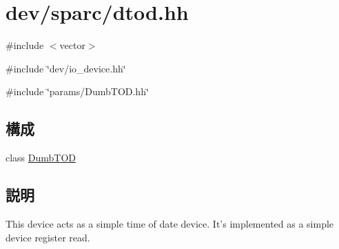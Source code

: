 \hypertarget{dtod_8hh}{
\section{dev/sparc/dtod.hh}
\label{dtod_8hh}
}
{\ttfamily \#include $<$vector$>$}\par
{\ttfamily \#include \char`\"{}dev/io\_\-device.hh\char`\"{}}\par
{\ttfamily \#include \char`\"{}params/DumbTOD.hh\char`\"{}}\par
\subsection*{構成}
\begin{DoxyCompactItemize}
\item 
class \hyperlink{classDumbTOD}{DumbTOD}
\end{DoxyCompactItemize}


\subsection{説明}
This device acts as a simple time of date device. It's implemented as a simple device register read. 